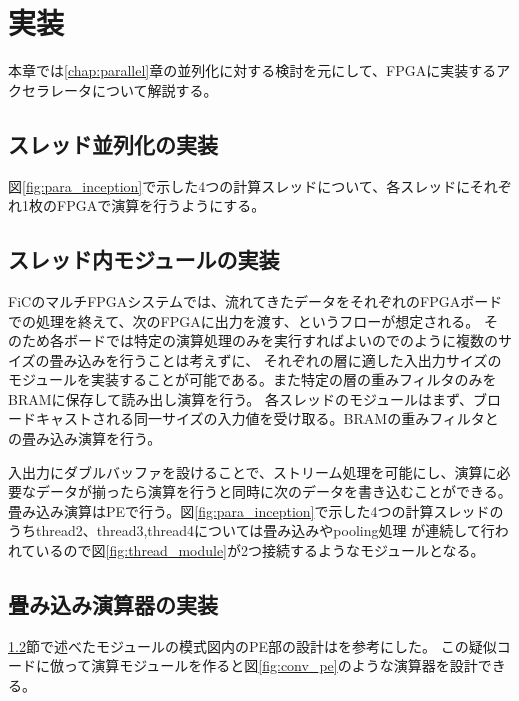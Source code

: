 \chapter{実装}
{
\label{chap:implement}
本章では\ref{chap:parallel}章の並列化に対する検討を元にして、FPGAに実装するアクセラレータについて解説する。
\section{スレッド並列化の実装}
\label{sec:thread_impl}
図\ref{fig:para_inception}で示した4つの計算スレッドについて、各スレッドにそれぞれ1枚のFPGAで演算を行うようにする。

\section{スレッド内モジュールの実装}
\label{sec:module_impl}
FiCのマルチFPGAシステムでは、流れてきたデータをそれぞれのFPGAボードでの処理を終えて、次のFPGAに出力を渡す、というフローが想定される。
そのため各ボードでは特定の演算処理のみを実行すればよいので\cite{optimized}のように複数のサイズの畳み込みを行うことは考えずに、
それぞれの層に適した入出力サイズのモジュールを実装することが可能である。また特定の層の重みフィルタのみをBRAMに保存して読み出し演算を行う。
各スレッドのモジュールはまず、ブロードキャストされる同一サイズの入力値を受け取る。BRAMの重みフィルタとの畳み込み演算を行う。


入出力にダブルバッファを設けることで、ストリーム処理を可能にし、演算に必要なデータが揃ったら演算を行うと同時に次のデータを書き込むことができる。
畳み込み演算はPEで行う。図\ref{fig:para_inception}で示した4つの計算スレッドのうちthread2、thread3,thread4については畳み込みやpooling処理
が連続して行われているので図\ref{fig:thread_module}が2つ接続するようなモジュールとなる。

\section{畳み込み演算器の実装}
\label{sec:conv_impl}
\ref{sec:module_impl}節で述べたモジュールの模式図内のPE部の設計は\cite{optimized}を参考にした。
この疑似コードに倣って演算モジュールを作ると図\ref{fig:conv_pe}のような演算器を設計できる。

}
